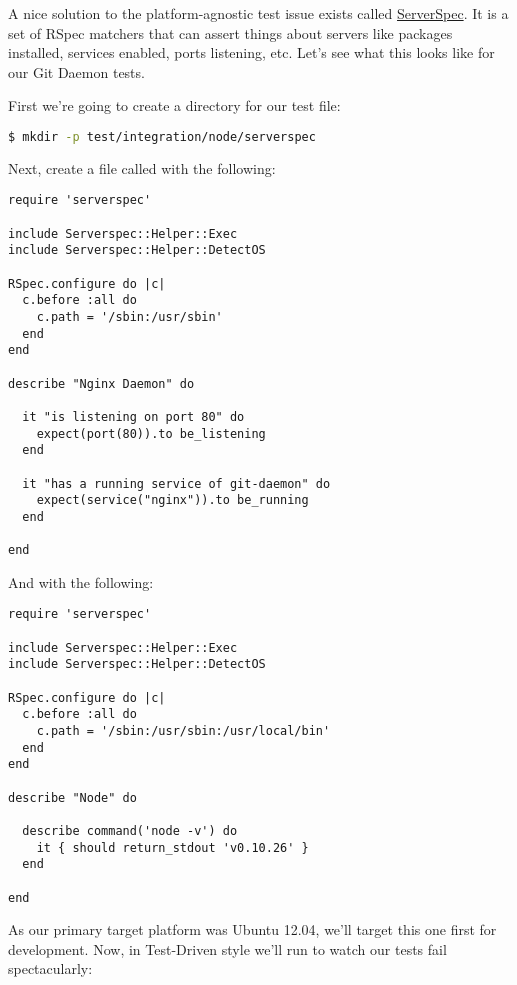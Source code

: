 A nice solution to the platform-agnostic test issue exists called \href{http://serverspec.org/}{ServerSpec}. It is a set of RSpec matchers that can assert things about servers like packages installed, services enabled, ports listening, etc. Let's see what this looks like for our Git Daemon tests.

First we're going to create a directory for our test file:

\begin{lstlisting}[language=Bash,label=lst:testing-test-kitchen36]
$ mkdir -p test/integration/node/serverspec
\end{lstlisting}

Next, create a file called  with the following:

\begin{lstlisting}[label=lst:testing-test-kitchen37]
require 'serverspec'

include Serverspec::Helper::Exec
include Serverspec::Helper::DetectOS

RSpec.configure do |c|
  c.before :all do
    c.path = '/sbin:/usr/sbin'
  end
end

describe "Nginx Daemon" do

  it "is listening on port 80" do
    expect(port(80)).to be_listening
  end

  it "has a running service of git-daemon" do
    expect(service("nginx")).to be_running
  end

end
\end{lstlisting}

And  with the following:

\begin{lstlisting}[label=lst:testing-test-kitchen39]
require 'serverspec'

include Serverspec::Helper::Exec
include Serverspec::Helper::DetectOS

RSpec.configure do |c|
  c.before :all do
    c.path = '/sbin:/usr/sbin:/usr/local/bin'
  end
end

describe "Node" do

  describe command('node -v') do
    it { should return_stdout 'v0.10.26' }
  end

end
\end{lstlisting}

As our primary target platform was Ubuntu 12.04, we'll target this one first for development. Now, in Test-Driven style we'll run  to watch our tests fail spectacularly:

